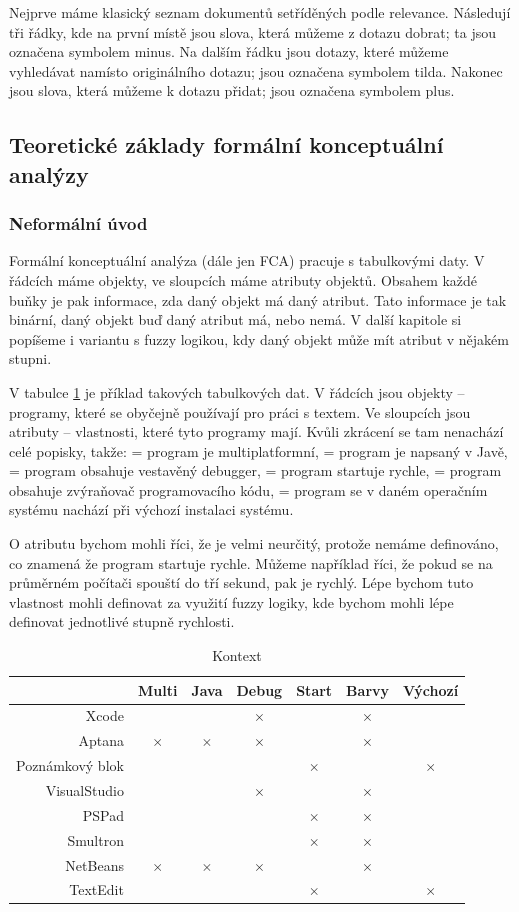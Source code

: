 \documentclass[12pt]{article}
\newcommand{\yes}{$\times$}
\newcommand{\ssection}[1]{\subsection{#1}}
\newcommand{\sssection}[1]{\subsubsection{#1}}
\begin{document}
Nejprve máme klasický seznam dokumentů setříděných podle relevance. Následují tři řádky, kde na první místě jsou slova, která můžeme z dotazu dobrat; ta jsou označena symbolem minus. Na dalším řádku jsou dotazy, které můžeme vyhledávat namísto originálního dotazu; jsou označena symbolem tilda. Nakonec jsou slova, která můžeme k dotazu přidat; jsou označena symbolem plus.

\ssection{Teoretické základy formální konceptuální analýzy}
\sssection{Neformální úvod}
Formální konceptuální analýza (dále jen FCA) pracuje s tabulkovými daty. V řádcích máme objekty, ve sloupcích máme atributy objektů. Obsahem každé buňky je pak informace, zda daný objekt má daný atribut. Tato informace je tak binární, daný objekt buď daný atribut má, nebo nemá. V další kapitole si popíšeme i variantu s fuzzy logikou, kdy daný objekt může mít atribut v nějakém stupni. 

V tabulce \ref{tab.con1} je příklad takových tabulkových dat. V řádcích jsou objekty -- programy, které se obyčejně používají pro práci s textem. Ve sloupcích jsou atributy -- vlastnosti, které tyto programy mají. Kvůli zkrácení se tam nenachází celé popisky, takže:  = program je multiplatformní,  = program je napsaný v Javě,  = program obsahuje vestavěný debugger,  = program startuje rychle,  = program obsahuje zvýraňovač programovacího kódu,  = program se v daném operačním systému nachází při výchozí instalaci systému. 

O atributu  bychom mohli říci, že je velmi neurčitý, protože nemáme definováno, co znamená že program startuje rychle. Můžeme například říci, že pokud se na průměrném počítači spouští do tří sekund, pak je rychlý. Lépe bychom tuto vlastnost mohli definovat za využití fuzzy logiky, kde bychom mohli lépe definovat jednotlivé stupně rychlosti. 

\begin{table}
\begin{tabular}{r|cccccc}
\toprule
&Multi&Java&Debug&Start&Barvy&Výchozí\\
\midrule
Xcode&&&\yes&&\yes\\
Aptana&\yes&\yes&\yes&&\yes\\
Poznámkový blok&&&&\yes&&\yes\\
VisualStudio&&&\yes&&\yes\\
PSPad&&&&\yes&\yes\\
Smultron&&&&\yes&\yes\\
NetBeans&\yes&\yes&\yes&&\yes\\
TextEdit&&&&\yes&&\yes\\
\bottomrule
\end{tabular}
\caption{Kontext} \label{tab.con1}
\end{table}
\end{document}
